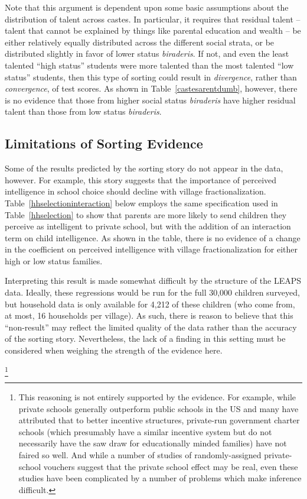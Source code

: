 Note that this argument is dependent upon some basic assumptions about the distribution of talent across castes. In particular, it requires that residual talent -- talent that cannot be explained by things like parental education and wealth -- be either relatively equally distributed across the different social strata, or be distributed slightly in favor of lower status \emph{biraderis}. If not, and even the least talented ``high status'' students were more talented than the most talented ``low status'' students, then this type of sorting could result in \emph{divergence}, rather than \emph{convergence}, of test scores. As shown in Table~\ref{castesarentdumb}, however, there is no evidence that those from higher social status \emph{biraderis} have higher residual talent than those from low status \emph{biraderis}.




\subsection{Limitations of Sorting Evidence}\label{}

Some of the results predicted by the sorting story do not appear in the data, however. For example, this story suggests that the importance of perceived intelligence in school choice should decline with village fractionalization. Table~\ref{hhselectioninteraction} below employs the same specification used in Table~\ref{hhselection} to show that parents are more likely to send children they perceive as intelligent to private school, but with the addition of an interaction term on child intelligence. As shown in the table, there is no evidence of a change in the coefficient on perceived intelligence with village fractionalization for either high or low status families.

Interpreting this result is made somewhat difficult by the structure of the LEAPS data. Ideally, these regressions would be run for the full 30,000 children surveyed, but household data is only available for 4,212 of these children (who come from, at most, 16 households per village). As such, there is reason to believe that this ``non-result'' may reflect the limited quality of the data rather than the accuracy of the sorting story. Nevertheless, the lack of a finding in this setting must be considered when weighing the strength of the evidence here. 






\footnote{This reasoning is not entirely supported by the evidence. For example, while private schools generally outperform public schools in the US and many have attributed that to better incentive structures, private-run government charter schools (which presumably have a similar incentive system but do not necessarily have the saw draw for educationally minded families) have not faired so well.\citep{Fuller:2002td} And while a number of studies of randomly-assigned private-school vouchers suggest that the private school effect may be real, even these studies have been complicated by a number of problems which make inference difficult.} 



